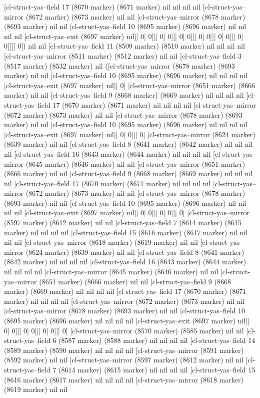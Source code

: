 {{[cl-struct-yas--field 17 (8670 marker) (8671 marker) nil nil nil nil [cl-struct-yas--mirror (8672 marker) (8673 marker) nil nil [cl-struct-yas--mirror (8678 marker) (8693 marker) nil nil [cl-struct-yas--field 10 (8695 marker) (8696 marker) nil nil nil nil [cl-struct-yas--exit (8697 marker) nil]] 0] 0]]] 0] 0]]] 0] 0]]] 0] 0]]] 0] 0]]] 0] 0]]]] 0]) nil nil [cl-struct-yas--field 11 (8509 marker) (8510 marker) nil nil nil nil [cl-struct-yas--mirror (8511 marker) (8512 marker) nil nil [cl-struct-yas--field 3 (8517 marker) (8532 marker) nil ([cl-struct-yas--mirror (8678 marker) (8693 marker) nil nil [cl-struct-yas--field 10 (8695 marker) (8696 marker) nil nil nil nil [cl-struct-yas--exit (8697 marker) nil]] 0] [cl-struct-yas--mirror (8651 marker) (8666 marker) nil nil [cl-struct-yas--field 9 (8668 marker) (8669 marker) nil nil nil nil [cl-struct-yas--field 17 (8670 marker) (8671 marker) nil nil nil nil [cl-struct-yas--mirror (8672 marker) (8673 marker) nil nil [cl-struct-yas--mirror (8678 marker) (8693 marker) nil nil [cl-struct-yas--field 10 (8695 marker) (8696 marker) nil nil nil nil [cl-struct-yas--exit (8697 marker) nil]] 0] 0]]] 0] [cl-struct-yas--mirror (8624 marker) (8639 marker) nil nil [cl-struct-yas--field 8 (8641 marker) (8642 marker) nil nil nil nil [cl-struct-yas--field 16 (8643 marker) (8644 marker) nil nil nil nil [cl-struct-yas--mirror (8645 marker) (8646 marker) nil nil [cl-struct-yas--mirror (8651 marker) (8666 marker) nil nil [cl-struct-yas--field 9 (8668 marker) (8669 marker) nil nil nil nil [cl-struct-yas--field 17 (8670 marker) (8671 marker) nil nil nil nil [cl-struct-yas--mirror (8672 marker) (8673 marker) nil nil [cl-struct-yas--mirror (8678 marker) (8693 marker) nil nil [cl-struct-yas--field 10 (8695 marker) (8696 marker) nil nil nil nil [cl-struct-yas--exit (8697 marker) nil]] 0] 0]]] 0] 0]]] 0] [cl-struct-yas--mirror (8597 marker) (8612 marker) nil nil [cl-struct-yas--field 7 (8614 marker) (8615 marker) nil nil nil nil [cl-struct-yas--field 15 (8616 marker) (8617 marker) nil nil nil nil [cl-struct-yas--mirror (8618 marker) (8619 marker) nil nil [cl-struct-yas--mirror (8624 marker) (8639 marker) nil nil [cl-struct-yas--field 8 (8641 marker) (8642 marker) nil nil nil nil [cl-struct-yas--field 16 (8643 marker) (8644 marker) nil nil nil nil [cl-struct-yas--mirror (8645 marker) (8646 marker) nil nil [cl-struct-yas--mirror (8651 marker) (8666 marker) nil nil [cl-struct-yas--field 9 (8668 marker) (8669 marker) nil nil nil nil [cl-struct-yas--field 17 (8670 marker) (8671 marker) nil nil nil nil [cl-struct-yas--mirror (8672 marker) (8673 marker) nil nil [cl-struct-yas--mirror (8678 marker) (8693 marker) nil nil [cl-struct-yas--field 10 (8695 marker) (8696 marker) nil nil nil nil [cl-struct-yas--exit (8697 marker) nil]] 0] 0]]] 0] 0]]] 0] 0]]] 0] [cl-struct-yas--mirror (8570 marker) (8585 marker) nil nil [cl-struct-yas--field 6 (8587 marker) (8588 marker) nil nil nil nil [cl-struct-yas--field 14 (8589 marker) (8590 marker) nil nil nil nil [cl-struct-yas--mirror (8591 marker) (8592 marker) nil nil [cl-struct-yas--mirror (8597 marker) (8612 marker) nil nil [cl-struct-yas--field 7 (8614 marker) (8615 marker) nil nil nil nil [cl-struct-yas--field 15 (8616 marker) (8617 marker) nil nil nil nil [cl-struct-yas--mirror (8618 marker) (8619 marker) nil nil }}
